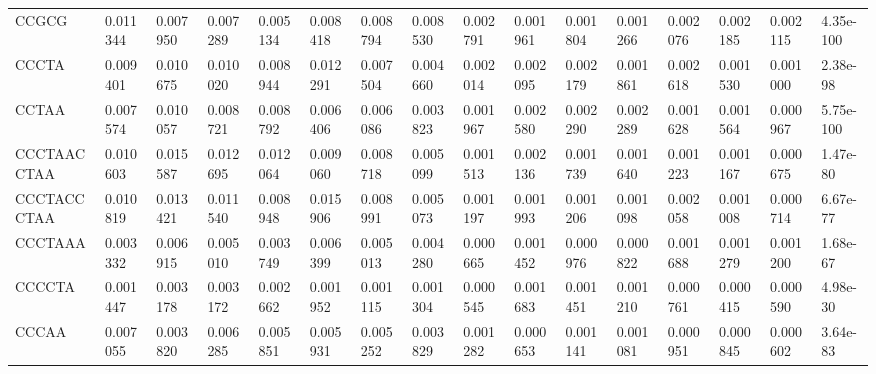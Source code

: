 \begin{samepage}
\begin{table}[h!]
\begin{tabular}{llllllllllllllll}
CCGCG          & 0.011344       & 0.007950       & 0.007289       & 0.005134       & 0.008418       & 0.008794       & 0.008530       & 0.002791       & 0.001961       & 0.001804       & 0.001266       & 0.002076       & 0.002185       & 0.002115       & 4.35e-100                          \\
CCCTA          & 0.009401       & 0.010675       & 0.010020       & 0.008944       & 0.012291       & 0.007504       & 0.004660       & 0.002014       & 0.002095       & 0.002179       & 0.001861       & 0.002618       & 0.001530       & 0.001000       & 2.38e-98                           \\
CCTAA          & 0.007574       & 0.010057       & 0.008721       & 0.008792       & 0.006406       & 0.006086       & 0.003823       & 0.001967       & 0.002580       & 0.002290       & 0.002289       & 0.001628       & 0.001564       & 0.000967       & 5.75e-100                          \\
CCCTAACCTAA    & 0.010603       & 0.015587       & 0.012695       & 0.012064       & 0.009060       & 0.008718       & 0.005099       & 0.001513       & 0.002136       & 0.001739       & 0.001640       & 0.001223       & 0.001167       & 0.000675       & 1.47e-80                           \\
CCCTACCCTAA    & 0.010819       & 0.013421       & 0.011540       & 0.008948       & 0.015906       & 0.008991       & 0.005073       & 0.001197       & 0.001993       & 0.001206       & 0.001098       & 0.002058       & 0.001008       & 0.000714       & 6.67e-77                           \\
CCCTAAA        & 0.003332       & 0.006915       & 0.005010       & 0.003749       & 0.006399       & 0.005013       & 0.004280       & 0.000665       & 0.001452       & 0.000976       & 0.000822       & 0.001688       & 0.001279       & 0.001200       & 1.68e-67                           \\
CCCCTA         & 0.001447       & 0.003178       & 0.003172       & 0.002662       & 0.001952       & 0.001115       & 0.001304       & 0.000545       & 0.001683       & 0.001451       & 0.001210       & 0.000761       & 0.000415       & 0.000590       & 4.98e-30                           \\
CCCAA          & 0.007055       & 0.003820       & 0.006285       & 0.005851       & 0.005931       & 0.005252       & 0.003829       & 0.001282       & 0.000653       & 0.001141       & 0.001081       & 0.000951       & 0.000845       & 0.000602       & 3.64e-83                           \\

\end{tabular}
\end{table}
\end{samepage}
